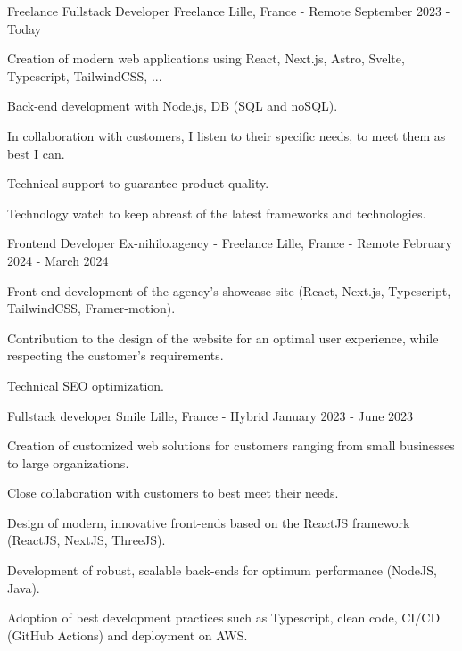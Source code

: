 
\begin{cventries}
  \cventry
    {Freelance Fullstack Developer} %
    {Freelance} %
    {Lille, France - Remote} %
    {September 2023 - Today} %
    {
      \begin{cvitems} %
        \item {Creation of modern web applications using React, Next.js, Astro, Svelte, Typescript, TailwindCSS, ...}
        \item {Back-end development with Node.js, DB (SQL and noSQL).}
        \item {In collaboration with customers, I listen to their specific needs, to meet them as best I can.}
        \item {Technical support to guarantee product quality.}
        \item {Technology watch to keep abreast of the latest frameworks and technologies.}
      \end{cvitems}
    }

  \cventry
    {Frontend Developer} %
    {Ex-nihilo.agency - Freelance} %
    {Lille, France - Remote} %
    {February 2024 - March 2024} %
    {
      \begin{cvitems} %
        \item {Front-end development of the agency's showcase site (React, Next.js, Typescript, TailwindCSS, Framer-motion).}
        \item {Contribution to the design of the website for an optimal user experience, while respecting the customer's requirements.}
        \item {Technical SEO optimization.}
      \end{cvitems}
    }

  \cventry
    {Fullstack developer} %
    {Smile} %
    {Lille, France - Hybrid} %
    {January 2023 - June 2023} %
    {
      \begin{cvitems} %
        \item {Creation of customized web solutions for customers ranging from small businesses to large organizations.}
        \item {Close collaboration with customers to best meet their needs.}
        \item {Design of modern, innovative front-ends based on the ReactJS framework (ReactJS, NextJS, ThreeJS).}
        \item {Development of robust, scalable back-ends for optimum performance (NodeJS, Java).}
        \item {Adoption of best development practices such as Typescript, clean code, CI/CD (GitHub Actions) and deployment on AWS.}
      \end{cvitems}
    }


\end{cventries}
